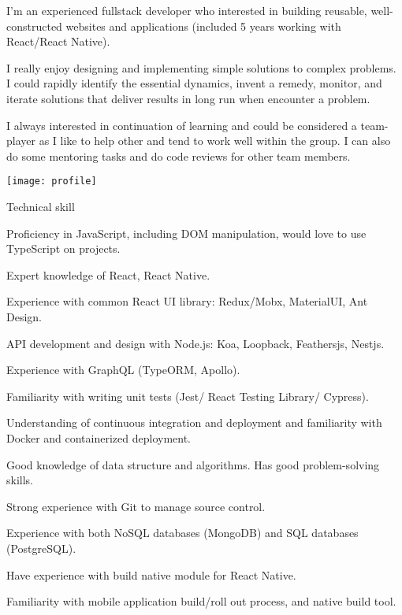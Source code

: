 \documentclass{resume}
\begin{document}

  \noindent\begin{minipage}{0.8\textwidth}%
    I'm an experienced fullstack developer who interested in building reusable, well-constructed websites and applications
    (included 5 years working with React/React Native). \newline
    
    I really enjoy designing and implementing simple solutions to complex problems. 
    I could rapidly identify the essential dynamics, invent a remedy, monitor, and iterate solutions 
    that deliver results in long run when encounter a problem. \newline

    I always interested in continuation of learning and could be considered a team-player as I like to help other and tend 
    to work well within the group. I can also do some mentoring tasks and do code reviews for other team members. \newline
    \end{minipage}%
    \hfill%
    \begin{minipage}{0.1\textwidth}\raggedright
      \texttt{[image: profile]}
    \end{minipage}

  \begin{rSection}{Technical skill}
    \begin{rSubsection}{}{}{}{}
      \item Proficiency in JavaScript, including DOM manipulation, would love to use TypeScript on projects.
      \item Expert knowledge of React, React Native.
      \item Experience with common React UI library: Redux/Mobx, MaterialUI, Ant Design.
      \item API development and design with Node.js: Koa, Loopback, Feathersjs, Nestjs.
      \item Experience with GraphQL (TypeORM, Apollo).
      \item Familiarity with writing unit tests (Jest/ React Testing Library/ Cypress).
      \item Understanding of continuous integration and deployment and familiarity with Docker and containerized deployment.
      \item Good knowledge of data structure and algorithms. Has good problem-solving skills.
      \item Strong experience with Git to manage source control.
      \item Experience with both NoSQL databases (MongoDB) and SQL databases (PostgreSQL).
      \item Have experience with build native module for React Native.
      \item Familiarity with mobile application build/roll out process, and native build tool.
    \end{rSubsection}
  \end{rSection}
  
\end{document}
